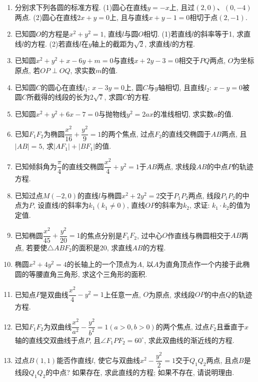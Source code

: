 \documentclass[10pt,a4paper]{article}
\newcommand{\blank}[1]{\underline{\hbox to #1pt{}}}
\newcommand{\bracket}[1]{(\hbox to #1pt{})}
\newcommand{\fourch}[4]{\par\begin{tabular}{p{.23\textwidth}p{.23\textwidth}p{.23\textwidth}p{.23\textwidth}}
A.~#1 &B.~#2& C.~#3& D.~#4
\end{tabular}}
\begin{document}
\begin{enumerate}[1.]
\fourch{到两坐标轴距离相等的点的轨迹方程为$y=x$;}{两相交直线$y=\dfrac{\sqrt 3}3x$与$y=\sqrt 3x$的夹角平分线的方程为$y=x$;}{$\triangle ABC$的三个顶点的坐标分别为$A(1,1)$、$B(3,1)$、$C(1,3)$, $BC$边上的中线方程为$y=x$;}{与两顶点$A(-1,0)$、$B(1,0)$的连线的夹角为$90^{\circ }$的动点的轨迹方程为$x^2+y^2=1$}
(2)直线$x-\sqrt 3y=0$绕原点按逆时针方向旋转$30^{\circ }$后所得的直线与圆$(x-2)^2+y^2=3$的位置关系是\blank{50}\bracket{20}.
\fourch{直线过圆心;}{直线与圆相交, 但不过圆心;}{直线与圆相切;}{直线与圆无公共点}
\item 分别求下列各圆的标准方程.
(1)圆心在直线$y=-x$上, 且过$(2,0)$、$(0,-4)$两点.
(2)圆心在直线$2x+y=0$上, 且与直线$x+y-1=0$相切于点$(2,-1)$.
\item 已知圆$O$的方程是$x^2+y^2=1$, 直线$l$与圆$O$相切.
(1)若直线$l$的斜率等于1, 求直线$l$的方程.
(2)若直线$l$在$y$轴上的截距为$\sqrt 2$, 求直线$l$的方程.
\item 已知圆$x^2+y^2+x-6y+m=0$与直线$x+2y-3=0$相交于$PQ$两点, $O$为坐标原点, 若$OP\perp OQ$, 求实数$m$的值.
\item 已知圆$C$的圆心在直线$l_1$: $x-3y=0$上, 圆$C$与$y$轴相切, 且直线$l_2$: $x-y=0$被圆$C$所截得的线段的长为$2\sqrt 7$, 求圆$C$的方程.
\item 已知圆$x^2+y^2+6x-7=0$与抛物线$y^2=2ax$的准线相切, 求实数$a$的值.
\item 已知$F_1F_2$为椭圆$\dfrac{x^2}{16}+\dfrac{y^2}9=1$的两个焦点, 过点$F_2$的直线交椭圆于$AB$两点, 且$|AB|=5$, 求$|AF_1|+|BF_1|$的值.
\item 已知倾斜角为$\dfrac{\pi }4$的直线交椭圆$\dfrac{x^2}4+y^2=1$于$AB$两点, 求线段$AB$的中点$P$的轨迹方程.
\item 已知过点$M(-2,0)$的直线$l$与椭圆$x^2+2y^2=2$交于$P_1P_2$两点, 线段$P_1P_2$的中点为$P$, 设直线$l$的斜率为$k_1(k_1\ne 0)$, 直线$OP$的斜率为$k_2$, 求证: $k_1\cdot k_2$的值为定值.
\item 已知椭圆$\dfrac{x^2}{45}+\dfrac{y^2}{20}=1$的焦点分别是$F_1F_2$, 过中心$O$作直线与椭圆相交于$AB$两点, 若要使$\triangle ABF_2$的面积是20, 求直线$AB$的方程.
\item 椭圆$x^2+4y^2=4$的长轴上的一个顶点为$A$, 以$A$为直角顶点作一个内接于此椭圆的等腰直角三角形, 求这个三角形的面积.
\item 已知点$P$是双曲线$\dfrac{x^2}4-y^2=1$上任意一点, $O$为原点, 求线段$OP$的中点$Q$的轨迹方程.
\item 已知$F_1F_2$为双曲线$\dfrac{x^2}{a^2}-\dfrac{y^2}{b^2}=1(a>0,b>0)$的两个焦点, 过点$F_2$且垂直于$x$轴的直线交双曲线于点$P$, 且$\angle F_1PF_2=60^{\circ }$, 求此双曲线的渐近线的方程.
\item 过点$B(1,1)$能否作直线$l$, 使它与双曲线$x^2-\dfrac{y^2}2=1$交于$Q_1Q_2$两点, 且点$B$是线段$Q_1Q_2$的中点? 如果存在, 求此直线的方程; 如果不存在, 请说明理由.

\end{enumerate}
\end{document}
